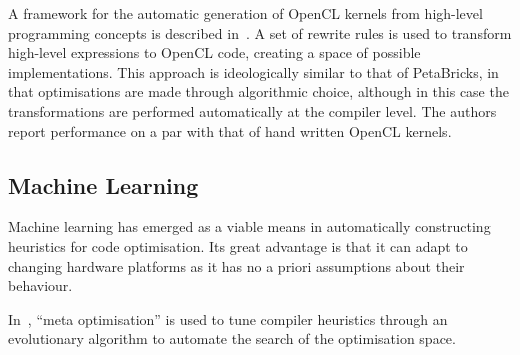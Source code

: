 A framework for the automatic generation of OpenCL kernels from high-level programming concepts is described in~\cite{Steuwer2015}. A set of rewrite rules is used to transform high-level expressions to OpenCL code, creating a space of possible implementations. This approach is ideologically similar to that of PetaBricks, in that optimisations are made through algorithmic choice, although in this case the transformations are performed automatically at the compiler level. The authors report performance on a par with that of hand written OpenCL kernels.



\subsection{Machine Learning}

Machine learning has emerged as a viable means in automatically constructing heuristics for code optimisation. Its great advantage is that it can adapt to changing hardware platforms as it has no a priori assumptions about their behaviour.



In~\cite{Stephenson2003}, ``meta optimisation'' is used to tune compiler heuristics through an evolutionary algorithm to automate the search of the optimisation space.



